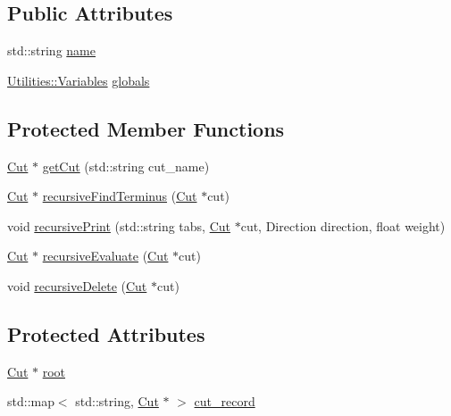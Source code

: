 \subsection*{Public Attributes}
\begin{DoxyCompactItemize}
\item 
std\+::string \hyperlink{classCutflow_a268e204c942ca35895a94f1be7ce111d}{name}
\item 
\hyperlink{classUtilities_1_1Variables}{Utilities\+::\+Variables} \hyperlink{classCutflow_a71390324488ac6ed4a72c41f4a2c1c10}{globals}
\end{DoxyCompactItemize}
\subsection*{Protected Member Functions}
\begin{DoxyCompactItemize}
\item 
\hyperlink{classCut}{Cut} $\ast$ \hyperlink{classCutflow_a20193ee89ee39b0fc58ab4f27e2779db}{get\+Cut} (std\+::string cut\+\_\+name)
\item 
\hyperlink{classCut}{Cut} $\ast$ \hyperlink{classCutflow_a6949f1d9e7d74c6ab8cf0c6f28ac3701}{recursive\+Find\+Terminus} (\hyperlink{classCut}{Cut} $\ast$cut)
\item 
void \hyperlink{classCutflow_a54e6ae7d3e4c9efdb8fd830ab8a0e0e9}{recursive\+Print} (std\+::string tabs, \hyperlink{classCut}{Cut} $\ast$cut, Direction direction, float weight)
\item 
\hyperlink{classCut}{Cut} $\ast$ \hyperlink{classCutflow_ae4fc37122bc9437fe3cdaa9861c2bcec}{recursive\+Evaluate} (\hyperlink{classCut}{Cut} $\ast$cut)
\item 
void \hyperlink{classCutflow_adc7029b27ff8d742d10c75d6f6342dac}{recursive\+Delete} (\hyperlink{classCut}{Cut} $\ast$cut)
\end{DoxyCompactItemize}
\subsection*{Protected Attributes}
\begin{DoxyCompactItemize}
\item 
\hyperlink{classCut}{Cut} $\ast$ \hyperlink{classCutflow_a96f2343bfae77c94f2e87b5f3a128d6d}{root}
\item 
std\+::map$<$ std\+::string, \hyperlink{classCut}{Cut} $\ast$ $>$ \hyperlink{classCutflow_a76f5cbd82750844d379384c7b1243cca}{cut\+\_\+record}
\end{DoxyCompactItemize}


